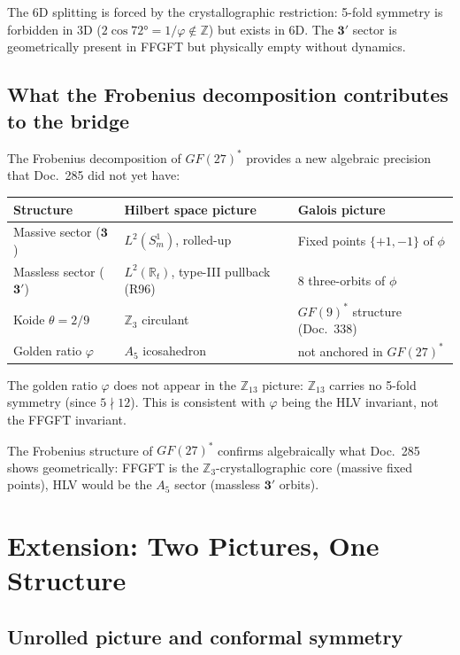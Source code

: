 The 6D splitting is forced by the crystallographic restriction: 5-fold symmetry
is forbidden in 3D ($2\cos72°=1/\varphi\notin\mathbb{Z}$) but exists in 6D.
The $\mathbf{3}'$ sector is geometrically present in FFGFT
but physically empty without dynamics.

\subsection{What the Frobenius decomposition contributes to the bridge \KM}

The Frobenius decomposition of $GF(27)^*$ provides a new algebraic precision
that Doc.~285 did not yet have:

\begin{center}
\renewcommand{\arraystretch}{1.3}
\begin{tabular}{lll}
\toprule
Structure & Hilbert space picture & Galois picture \\
\midrule
Massive sector ($\mathbf{3}$) & $L^2(S^1_m)$, rolled-up & Fixed points $\{+1,-1\}$ of $\phi$ \\
Massless sector ($\mathbf{3}'$) & $L^2(\mathbb{R}_t)$, type-III pullback (R96) & 8 three-orbits of $\phi$ \\
Koide $\theta=2/9$ & $\mathbb{Z}_3$ circulant & $GF(9)^*$ structure (Doc.~338) \\
Golden ratio $\varphi$ & $A_5$ icosahedron & not anchored in $GF(27)^*$ \\
\bottomrule
\end{tabular}
\end{center}

The golden ratio $\varphi$ does not appear in the $\mathbb{Z}_{13}$ picture:
$\mathbb{Z}_{13}$ carries no 5-fold symmetry (since $5\nmid12$). This is
consistent with $\varphi$ being the HLV invariant, not the FFGFT invariant.

The Frobenius structure of $GF(27)^*$ confirms algebraically what Doc.~285
shows geometrically: FFGFT is the $\mathbb{Z}_3$-crystallographic core
(massive fixed points), HLV would be the $A_5$ sector (massless $\mathbf{3}'$
orbits).

\section{Extension: Two Pictures, One Structure \KM}

\subsection{Unrolled picture and conformal symmetry}

